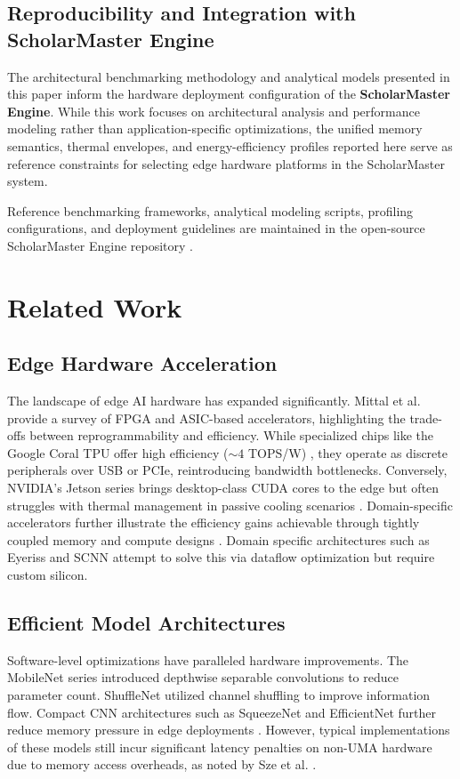 \documentclass[conference]{IEEEtran}
\begin{document}
\subsection{Reproducibility and Integration with ScholarMaster Engine}
The architectural benchmarking methodology and analytical models presented in this paper inform the hardware deployment configuration of the \textbf{ScholarMaster Engine}. While this work focuses on architectural analysis and performance modeling rather than application-specific optimizations, the unified memory semantics, thermal envelopes, and energy-efficiency profiles reported here serve as reference constraints for selecting edge hardware platforms in the ScholarMaster system.

Reference benchmarking frameworks, analytical modeling scripts, profiling configurations, and deployment guidelines are maintained in the open-source ScholarMaster Engine repository \cite{scholarmaster_repo}.

\section{Related Work}

\subsection{Edge Hardware Acceleration}
The landscape of edge AI hardware has expanded significantly. Mittal et al. \cite{b3} provide a survey of FPGA and ASIC-based accelerators, highlighting the trade-offs between reprogrammability and efficiency. While specialized chips like the Google Coral TPU offer high efficiency ($\sim 4$ TOPS/W) \cite{b7}, they operate as discrete peripherals over USB or PCIe, reintroducing bandwidth bottlenecks. Conversely, NVIDIA's Jetson series brings desktop-class CUDA cores to the edge but often struggles with thermal management in passive cooling scenarios \cite{b21}. Domain-specific accelerators further illustrate the efficiency gains achievable through tightly coupled memory and compute designs \cite{b25}. Domain specific architectures such as Eyeriss \cite{b26} and SCNN \cite{b27} attempt to solve this via dataflow optimization but require custom silicon.

\subsection{Efficient Model Architectures}
Software-level optimizations have paralleled hardware improvements. The MobileNet series \cite{b31, b32} introduced depthwise separable convolutions to reduce parameter count. ShuffleNet \cite{b33, b34} utilized channel shuffling to improve information flow. Compact CNN architectures such as SqueezeNet and EfficientNet further reduce memory pressure in edge deployments \cite{b35, b36}. However, typical implementations of these models still incur significant latency penalties on non-UMA hardware due to memory access overheads, as noted by Sze et al. \cite{b28}.
\end{document}
